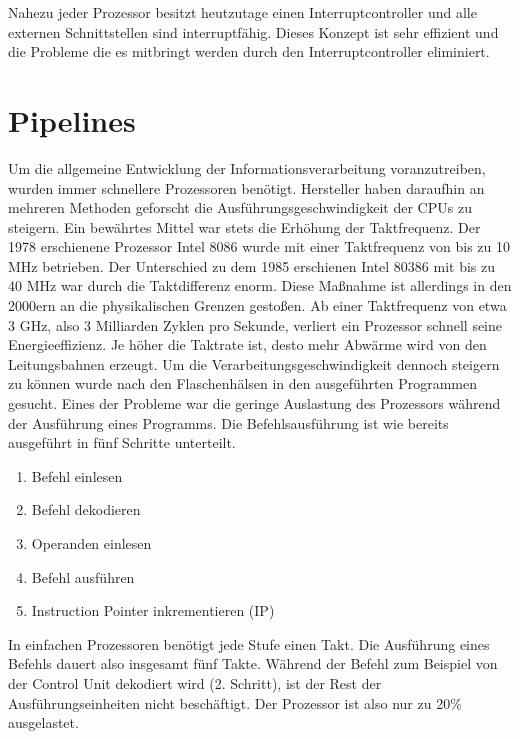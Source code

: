 \documentclass[a4paper,12pt]{article}
\begin{document}
\par\smallskip\noindent Nahezu jeder Prozessor besitzt heutzutage einen Interruptcontroller und alle externen Schnittstellen sind interruptfähig. Dieses Konzept ist sehr effizient und die Probleme die es mitbringt werden durch den Interruptcontroller eliminiert.

\newpage
\section{Pipelines}
Um die allgemeine Entwicklung der Informationsverarbeitung voranzutreiben, wurden immer schnellere Prozessoren benötigt. Hersteller haben daraufhin an mehreren Methoden geforscht die Ausführungsgeschwindigkeit der CPUs zu steigern. Ein bewährtes Mittel war stets die Erhöhung der Taktfrequenz. Der 1978 erschienene Prozessor Intel 8086 wurde mit einer Taktfrequenz von bis zu 10 MHz betrieben. Der Unterschied zu dem 1985 erschienen Intel 80386 mit bis zu 40 MHz war durch die Taktdifferenz enorm. Diese Maßnahme ist allerdings in den 2000ern an die physikalischen Grenzen gestoßen. Ab einer Taktfrequenz von etwa 3 GHz, also 3 Milliarden Zyklen pro Sekunde, verliert ein Prozessor schnell seine Energieeffizienz. Je höher die Taktrate ist, desto mehr Abwärme wird von den Leitungsbahnen erzeugt.
Um die Verarbeitungsgeschwindigkeit dennoch steigern zu können wurde nach den Flaschenhälsen in den ausgeführten Programmen gesucht. Eines der  Probleme war die geringe Auslastung des Prozessors während der Ausführung eines Programms. Die Befehlsausführung ist wie bereits ausgeführt in fünf Schritte unterteilt.
\begin{enumerate}
\item Befehl einlesen
\item Befehl dekodieren
\item Operanden einlesen
\item Befehl ausführen 
\item Instruction Pointer inkrementieren (IP)
\end{enumerate}
In einfachen Prozessoren benötigt jede Stufe einen Takt. Die Ausführung eines Befehls dauert also insgesamt fünf Takte. Während der Befehl zum Beispiel von der Control Unit dekodiert wird (2. Schritt), ist der Rest der Ausführungseinheiten nicht beschäftigt. Der Prozessor ist also nur zu 20\% ausgelastet. 
\end{document}
